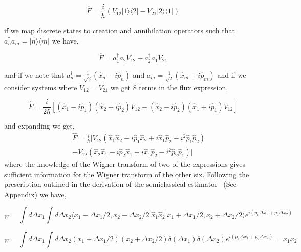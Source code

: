 \documentclass[phd,tocprelim]{cornell}
\begin{document}
\begin{equation}
\hat{F} = \frac{i}{\hbar}(V_{12} |1\rangle \langle 2|-V_{21}|2\rangle \langle 1|)
\end{equation}

if we map discrete states to creation and annihilation operators such that $a^{\dagger}_n a_m=  |n\rangle \langle m|$ we have,

\begin{equation}
\hat{F} =a^{\dagger}_1 a_2 V_{12} - a^{\dagger}_2 a_1 V_{21}
\end{equation}

and if we note that $a^{\dagger}_n= \frac{1}{\sqrt{2}}(\hat{x}_n- i\hat{p}_n)$ and $a_m= \frac{1}{\sqrt{2}}(\hat{x}_m+ i\hat{p}_m)$ and if we consider systems where $V_{12}=V_{21}$ we get 8 terms in the flux expression,

\begin{equation}
\hat{F} = \frac{i}{2\hbar}[(\hat{x}_1- i\hat{p}_1)(\hat{x}_2+ i\hat{p}_2)V_{12} - (\hat{x}_2- i\hat{p}_2)(\hat{x}_1+ i\hat{p}_1)V_{12}] 
\end{equation}

and expanding we get, 
\begin{eqnarray}
&&\hat{F} = \frac{i}{\hbar}[V_{12}(\hat{x}_1\hat{x}_2-i\hat{p}_1\hat{x}_2+i\hat{x}_1\hat{p}_2-i^2\hat{p}_1\hat{p}_2)
\\
\nonumber
&&-
V_{12}(\hat{x}_2\hat{x}_1-i\hat{p}_2\hat{x}_1+i\hat{x}_1\hat{p}_2-i^2\hat{p}_2\hat{p}_1)]
\end{eqnarray}
where the knowledge of the Wigner transform of two of the expressions gives sufficient information for the Wigner transform of the other six. Following the prescription outlined in the derivation of the semiclassical estimator~\cite{hel16} (See Appendix) we have,

\begin{equation}
[\hat{x}_1\hat{x}_2]_W=\int d \Delta x_1 \int d \Delta x_2 \langle {x}_1-\Delta {x}_{1}/{2},{x}_2-\Delta {x}_{2}/{2} | \hat{x}_1\hat{x}_2| {x}_1+\Delta {x}_{1}/{2},{x}_2+\Delta {x}_{2}/{2} \rangle e^{i(p_1\Delta x_1+p_2\Delta x_2)}
\end{equation}



\begin{equation}
[\hat{x}_1\hat{x}_2]_W=\int d \Delta x_1 \int d \Delta x_2 (x_1 +\Delta x_1/2) (x_2 +\Delta x_2/2)\delta (\Delta x_1) \delta (\Delta x_2) e^{i(p_1\Delta x_1+p_2\Delta x_2)}= x_1 x_2
\end{equation}
\end{document}
